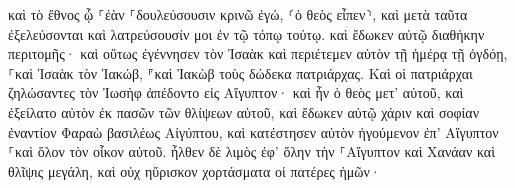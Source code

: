 \documentclass{openreader}
\begin{document}
καὶ τὸ ἔθνος ᾧ ⸀ἐὰν ⸀δουλεύσουσιν κρινῶ ἐγώ, ⸂ὁ θεὸς εἶπεν⸃, καὶ μετὰ ταῦτα ἐξελεύσονται καὶ λατρεύσουσίν μοι ἐν τῷ τόπῳ τούτῳ. 
καὶ ἔδωκεν αὐτῷ διαθήκην περιτομῆς· καὶ οὕτως ἐγέννησεν τὸν Ἰσαὰκ καὶ περιέτεμεν αὐτὸν τῇ ἡμέρᾳ τῇ ὀγδόῃ, ⸀καὶ Ἰσαὰκ τὸν Ἰακώβ, ⸁καὶ Ἰακὼβ τοὺς δώδεκα πατριάρχας. 
Καὶ οἱ πατριάρχαι ζηλώσαντες τὸν Ἰωσὴφ ἀπέδοντο εἰς Αἴγυπτον· καὶ ἦν ὁ θεὸς μετ’ αὐτοῦ, 
καὶ ἐξείλατο αὐτὸν ἐκ πασῶν τῶν θλίψεων αὐτοῦ, καὶ ἔδωκεν αὐτῷ χάριν καὶ σοφίαν ἐναντίον Φαραὼ βασιλέως Αἰγύπτου, καὶ κατέστησεν αὐτὸν ἡγούμενον ἐπ’ Αἴγυπτον ⸀καὶ ὅλον τὸν οἶκον αὐτοῦ. 
ἦλθεν δὲ λιμὸς ἐφ’ ὅλην τὴν ⸀Αἴγυπτον καὶ Χανάαν καὶ θλῖψις μεγάλη, καὶ οὐχ ηὕρισκον χορτάσματα οἱ πατέρες ἡμῶν· 
\end{document}
